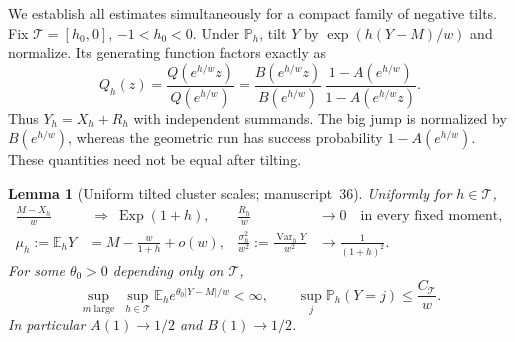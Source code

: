 \documentclass[11pt,a4paper]{article}
\newtheorem{lemma}[lemma]{Lemma}
\theoremstyle{definition}\newaliascnt{definition}{theorem}
\theoremstyle{remark}\newaliascnt{remark}{theorem}
\newcommand{\ljP}{\mathbb P}
\newcommand{\ljE}{\mathbb E}
\begin{document}
We establish all estimates simultaneously for a compact family of negative
tilts. Fix $\mathcal T=[h_0,0]$, $-1<h_0<0$. Under $\ljP_h$, tilt $Y$ by
$\exp(h(Y-M)/w)$ and normalize. Its generating function factors exactly as
\begin{equation}\label{jg:lb:eq:tiltfactor}
 Q_h(z)=\frac{Q(e^{h/w}z)}{Q(e^{h/w})}
 =\frac{B(e^{h/w}z)}{B(e^{h/w})}\,
   \frac{1-A(e^{h/w})}{1-A(e^{h/w}z)}.
\end{equation}
Thus $Y_h=X_h+R_h$ with independent summands. The big jump is normalized by
$B(e^{h/w})$, whereas the geometric run has success probability
$1-A(e^{h/w})$. These quantities need not be equal after tilting.

\begin{lemma}[Uniform tilted cluster scales; manuscript~36]
\label{jg:lb:lem:moments}
Uniformly for $h\in\mathcal T$,
\begin{align}
 \frac{M-X_h}{w}&\ \Longrightarrow\ \operatorname{Exp}(1+h),
 &\frac{R_h}{w}&\longrightarrow0\quad\text{in every fixed moment},\label{jg:lb:eq:clusterlimits}\\
 \mu_h:=\ljE_hY&=M-\frac{w}{1+h}+o(w),
 &\frac{\sigma_h^2}{w^2}:=\frac{\operatorname{Var}_hY}{w^2}
     &\longrightarrow\frac1{(1+h)^2}.\label{jg:lb:eq:moments}
\end{align}
For some $\theta_0>0$ depending only on $\mathcal T$,
\begin{equation}\label{jg:lb:eq:expmoment}
 \sup_{m\ \mathrm{large}}\ \sup_{h\in\mathcal T}
       \ljE_h e^{\theta_0|Y-M|/w}<\infty,
 \qquad
 \sup_j\ljP_h(Y=j)\le\frac{C_{\mathcal T}}w.
\end{equation}
In particular $A(1)\to1/2$ and $B(1)\to1/2$.
\end{lemma}
\end{document}
